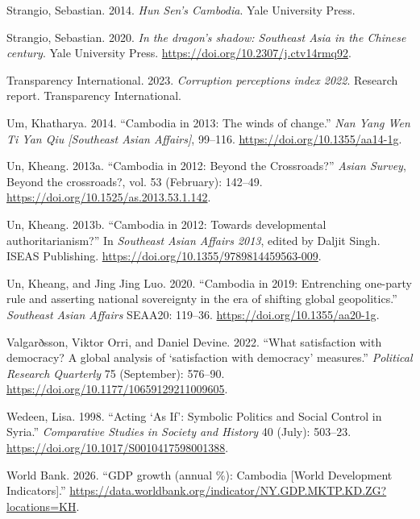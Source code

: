 \documentclass[
  12pt,
  letterpaper]{article}
\newlength{\cslhangindent}
\newenvironment{CSLReferences}[2] %
 {\begin{list}{}{%
  \setlength{\itemindent}{0pt}
  \setlength{\leftmargin}{0pt}
  \setlength{\parsep}{0pt}
  \ifodd #1
   \setlength{\leftmargin}{\cslhangindent}
   \setlength{\itemindent}{-1\cslhangindent}
  \fi
  \setlength{\itemsep}{#2\baselineskip}}}
 {\end{list}}
\begin{document}
\begin{CSLReferences}{1}{1}
Strangio, Sebastian. 2014. \emph{{Hun Sen's Cambodia}}. Yale University
Press.

Strangio, Sebastian. 2020. \emph{{In the dragon's shadow: Southeast Asia
in the Chinese century}}. Yale University Press.
\url{https://doi.org/10.2307/j.ctv14rmq92}.

Transparency International. 2023. \emph{{Corruption perceptions index
{2022}}}. Research report. Transparency International.

Um, Khatharya. 2014. {``{Cambodia in 2013: The winds of change}.''}
\emph{Nan Yang Wen Ti Yan Qiu {[}Southeast Asian Affairs{]}}, 99--116.
\url{https://doi.org/10.1355/aa14-1g}.

Un, Kheang. 2013a. {``{Cambodia in 2012: Beyond the Crossroads?}''}
\emph{Asian Survey}, Beyond the crossroads?, vol. 53 (February):
142--49. \url{https://doi.org/10.1525/as.2013.53.1.142}.

Un, Kheang. 2013b. {``{{Cambodia in 2012}: Towards developmental
authoritarianism?}''} In \emph{{Southeast Asian Affairs 2013}}, edited
by Daljit Singh. ISEAS Publishing.
\url{https://doi.org/10.1355/9789814459563-009}.

Un, Kheang, and Jing Jing Luo. 2020. {``{Cambodia in 2019: Entrenching
one-party rule and asserting national sovereignty in the era of shifting
global geopolitics}.''} \emph{Southeast Asian Affairs} SEAA20: 119--36.
\url{https://doi.org/10.1355/aa20-1g}.

Valgarðsson, Viktor Orri, and Daniel Devine. 2022. {``{What satisfaction
with democracy? A global analysis of {`satisfaction with democracy'}
measures}.''} \emph{Political Research Quarterly} 75 (September):
576--90. \url{https://doi.org/10.1177/10659129211009605}.

Wedeen, Lisa. 1998. {``{Acting {`As If'}: Symbolic Politics and Social
Control in Syria}.''} \emph{Comparative Studies in Society and History}
40 (July): 503--23. \url{https://doi.org/10.1017/S0010417598001388}.

World Bank. 2026. {``{GDP growth (annual \%): Cambodia {[}World
Development Indicators{]}}.''}
\url{https://data.worldbank.org/indicator/NY.GDP.MKTP.KD.ZG?locations=KH}.

\end{CSLReferences}
\end{document}
